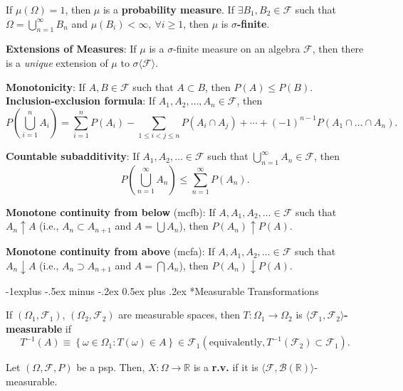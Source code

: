\documentclass[paper=letter,fontsize=3mm]{scrartcl}
\makeatletter
\newcommand{\Borel}{\mathcal{B}}
\newcommand{\R}{\mathbb{R}}
\newcommand\set[1]{\left\{ #1 \right\}}
\renewcommand{\subsection}{\@startsection{subsection}{2}{0mm}%
                                {-1explus -.5ex minus -.2ex}%
                                {0.5ex plus .2ex}%
                                {\normalfont\normalsize\bfseries}}
\makeatother
\begin{document}
\begin{multicols*}{3}
If $\mu(\Omega) = 1$, then $\mu$ is a \textbf{probability measure}. If $\exists B_1, B_2 \in \mathcal{F}$ such that $\Omega = \bigcup_{n=1}^\infty B_n$ and $\mu(B_i) < \infty, ~\forall i \ge 1$, then $\mu$ is \textbf{$\sigma$-finite}. \\\medskip

\textbf{Extensions of Measures}: If $\mu$ is a $\sigma$-finite measure on an algebra $\mathcal{F}$, then there is a \emph{unique} extension of $\mu$ to $\sigma\langle \mathcal{F}\rangle$. \\\medskip

\textbf{Monotonicity}: If $A, B \in \mathcal{F}$ such that $A \subset B$, then $P(A) \le P(B)$. \\\medskip
\textbf{Inclusion-exclusion formula}: If $A_1,A_2,\dots,A_n \in \mathcal{F}$, then
$$P\left( \bigcup_{i=1}^n A_i\right) = \sum_{i=1}^n P(A_i) - \sum_{1\le i < j \le n} P(A_i \cap A_j) + \cdots + (-1)^{n-1}P(A_1 \cap \dots \cap A_n).$$

\textbf{Countable subadditivity}: If $A_1,A_2,\dots \in \mathcal{F}$ such that $\bigcup_{n=1}^\infty A_n \in \mathcal{F}$, then
$$P\left( \bigcup_{n=1}^\infty A_n\right) \le \sum_{n=1}^\infty P(A_n).$$

\textbf{Monotone continuity from below} (mcfb): If $A, A_1, A_2, \dots \in \mathcal{F}$ such that $A_n \uparrow A$ (i.e., $A_n \subset A_{n+1}$ and $A = \bigcup A_n$), then $P(A_n) \uparrow P(A)$. \\\medskip

\textbf{Monotone continuity from above} (mcfa): If $A, A_1, A_2, \dots \in \mathcal{F}$ such that $A_n \downarrow A$ (i.e., $A_n \supset A_{n+1}$ and $A = \bigcap A_n$), then $P(A_n) \downarrow P(A)$. \\\medskip

\subsection*{Measurable Transformations}

If $(\Omega_1, \mathcal{F}_1)$, $(\Omega_2, \mathcal{F}_2)$ are measurable spaces, then $T: \Omega_1 \to \Omega_2$ is \textbf{$\langle \mathcal{F}_1, \mathcal{F}_2\rangle$-measurable} if
$$T^{-1}(A) \equiv \set{\omega \in \Omega_1: T(\omega) \in A} \in \mathcal{F}_1 (\text{equivalently}, T^{-1}(\mathcal{F}_2) \subset \mathcal{F}_1).$$

Let $(\Omega, \mathcal{F}, P)$ be a psp. Then, $X: \Omega \to \R$ is a \textbf{r.v.\@} if it is $\langle \mathcal{F}, \Borel(\R)\rangle$-measurable. \\\medskip


\end{multicols*}
\end{document}
